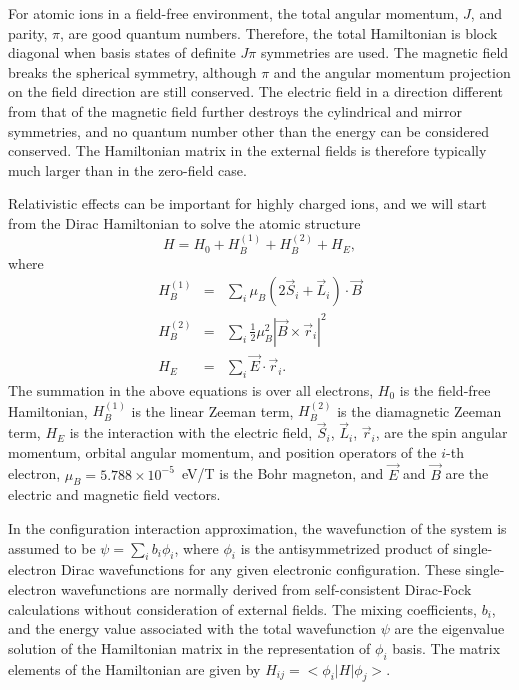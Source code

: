 For atomic ions in a field-free environment, the total angular  momentum, $J$,
and parity, $\pi$, are good quantum numbers. Therefore, the total  Hamiltonian
is block diagonal when basis states of definite $J\pi$ symmetries are used. The
magnetic field breaks the spherical symmetry, although $\pi$ and the angular
momentum projection on the field direction are still conserved. The electric
field in a direction different from that of the magnetic field further destroys
the cylindrical and mirror symmetries, and no quantum number other than the
energy can be considered conserved. The Hamiltonian matrix in the external
fields is therefore typically much larger than in the zero-field case.

Relativistic effects can be important for highly charged ions, and we will start
from the Dirac Hamiltonian to solve the atomic structure
\begin{equation}
H = H_0 + H_B^{(1)} + H_B^{(2)} + H_E,
\end{equation}
where
\begin{eqnarray}
H_B^{(1)} &=& \sum_i \mu_B\left(2\vec{S}_i + \vec{L}_i\right)\cdot\vec{B}
\nonumber\\
H_B^{(2)} &=& \sum_i \frac{1}{2}\mu_B^2\left|\vec{B}\times\vec{r}_i\right|^2
\nonumber\\
H_E &=& \sum_i \vec{E}\cdot\vec{r}_i.
\end{eqnarray}
The summation in the above equations is over all electrons, $H_0$ is the
field-free Hamiltonian, $H_B^{(1)}$ is the linear Zeeman term, $H_B^{(2)}$ is
the diamagnetic Zeeman term, $H_E$ is the interaction with the electric field,
$\vec{S}_i$, $\vec{L}_i$, $\vec{r}_i$, are the spin angular momentum, orbital
angular momentum, and position operators of the $i$-th electron, $\mu_B =
5.788\times 10^{-5}$~eV/T is the Bohr magneton, and $\vec{E}$ and $\vec{B}$ are
the electric and magnetic field vectors.

In the configuration interaction approximation, the wavefunction of the system
is assumed to be $\psi = \sum_i b_i \phi_i$, where $\phi_i$ is the
antisymmetrized product of single-electron Dirac wavefunctions for any given
electronic configuration. These single-electron wavefunctions are normally
derived from self-consistent Dirac-Fock calculations without consideration of
external fields. The mixing coefficients, $b_i$, and the energy value
associated with the total wavefunction $\psi$ are the eigenvalue solution of
the Hamiltonian matrix in the representation of $\phi_i$ basis. The matrix
elements of the Hamiltonian are given by $H_{ij} = <\phi_i|H|\phi_j>$.

